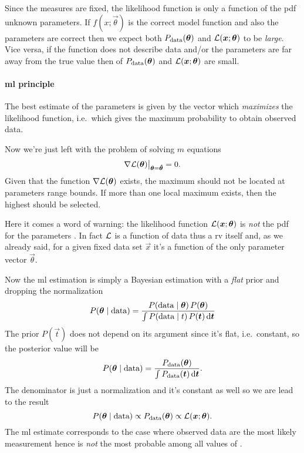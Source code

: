 Since the measures are fixed, the likelihood function is only a function of the \ac{pdf} unknown parameters.
If $f(x;\vec{\theta})$ is the correct model function and also the parameters are correct then we expect both $P_\textup{data}(\vec{\theta})$ and $\lkhd(\vec{x};\vec{\theta})$ to be \emph{large}.
Vice versa, if the function does not describe data and/or the parameters are far away from the true value then of $P_\textup{data}(\vec{\theta})$ and $\lkhd(\vec{x};\vec{\theta})$ are small.



\paragraph{\acl{ml} principle}
The best estimate of the parameters \vec{\theta} is given by the vector \vec{\hat\theta} which \emph{maximizes} the likelihood function, i.e.~which gives the maximum probability to obtain observed data.


Now we're just left with the problem of solving $m$ equations
\begin{equation}
	\V\lkhd(\vec{\theta})\big\lvert_{\vec{\theta} = \vec{\hat\theta}} = 0.
\end{equation}
Given that the function $\V\lkhd(\vec{\theta})$ exists, the maximum should not be located at parameters range bounds.
If more than one local maximum exists, then the highest should be selected.




Here it comes a word of warning: the likelihood function $\lkhd(\vec{x};\vec{\theta})$ is \emph{not} the \ac{pdf} for the parameters \vec{\theta}.
In fact $\lkhd$ is a function of data thus a \ac{rv} itself and, as we already said, for a given fixed data set $\vec{x}$ it's a function of the only parameter vector $\vec{\theta}$.



Now the \ac{ml} estimation is simply a Bayesian estimation with a \emph{flat} prior and dropping the normalization
\begin{equation}
	P(\vec{\theta}\mid\text{data}) = \frac{P(\textup{data}\mid\vec{\theta})\,P(\vec{\theta})}{\int P(\text{data}\mid t)\,P(\vec{t})\ud \vec{t}}
\end{equation}
The prior $P(\vec{t})$ does not depend on its argument since it's flat, i.e.~constant, so the posterior value will be
\begin{equation}
	P(\vec{\theta}\mid\text{data})  = \frac{P_\textup{data}(\vec{\theta})}{\int P_\textup{data}(\vec{t})\ud \vec{t}}.
\end{equation}
The denominator is just a normalization and it's constant as well so we are lead to the result
\begin{equation}
	P(\vec{\theta}\mid\text{data})\propto P_\textup{data}(\vec{\theta}) \propto \lkhd(\vec{x};\vec{\theta}).
\end{equation}
The \ac{ml} estimate \vec{\hat\theta} corresponds to the case where observed data are the most likely measurement hence \vec{\hat\theta} is \emph{not} the most probable among all values of \vec{\theta}.


